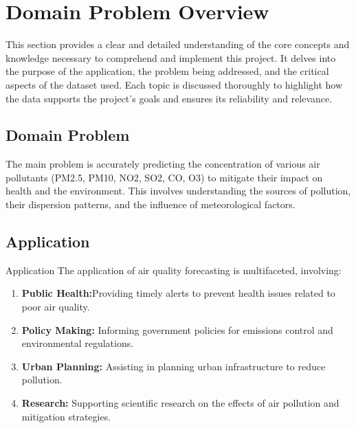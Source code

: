 %
%
%

\chapter{Domain Problem Overview}


This section provides a clear and detailed understanding of the core concepts and knowledge necessary to comprehend and implement this project. It delves into the purpose of the application, the problem being addressed, and the critical aspects of the dataset used. Each topic is discussed thoroughly to highlight how the data supports the project's goals and ensures its reliability and relevance.

\section{Domain Problem}

The main problem is accurately predicting the concentration of various air pollutants (PM2.5, PM10, NO2, SO2, CO, O3) to mitigate their impact on health and the environment. This involves understanding the sources of pollution, their dispersion patterns, and the influence of meteorological factors.


\section{Application}

Application The application of air quality forecasting is multifaceted, involving:
\begin{enumerate}

\item \textbf{Public Health:}Providing timely alerts to prevent health issues related to poor air quality\cite{EPA:2021}.
\item \textbf{Policy Making:} Informing government policies for emissions control and environmental regulations.
\item \textbf{Urban Planning:} Assisting in planning urban infrastructure to reduce pollution\cite{Kumar:2019}.	
\item \textbf{Research:} Supporting scientific research on the effects of air pollution and mitigation strategies.
\end{enumerate}

